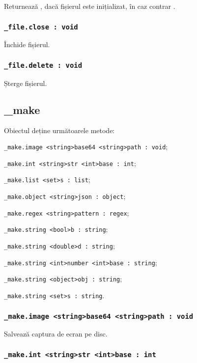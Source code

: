 Returnează \true, dacă fișierul este inițializat, în caz contrar \false.

\subsubsection{\lstinline|_file.close : void|}

Închide fișierul.

\subsubsection{\lstinline|_file.delete : void|}

Șterge fișierul.

\subsection{{\color{orange} \_make}}

Obiectul \make{} deține următoarele metode:
\begin{icItems}
	\item \lstinline|_make.image <string>base64 <string>path : void|;
	\item \lstinline|_make.int <string>str <int>base : int|;
	\item \lstinline|_make.list <set>s : list|;
	\item \lstinline|_make.object <string>json : object|;
	\item \lstinline|_make.regex <string>pattern : regex|;
	\item \lstinline|_make.string <bool>b : string|;
	\item \lstinline|_make.string <double>d : string|;
	\item \lstinline|_make.string <int>number <int>base : string|;
	\item \lstinline|_make.string <object>obj : string|;
	\item \lstinline|_make.string <set>s : string|.
\end{icItems}

\subsubsection{\lstinline|_make.image <string>base64 <string>path : void|}

Salvează captura de ecran pe disc.

\subsubsection{\lstinline|_make.int <string>str <int>base : int|}

